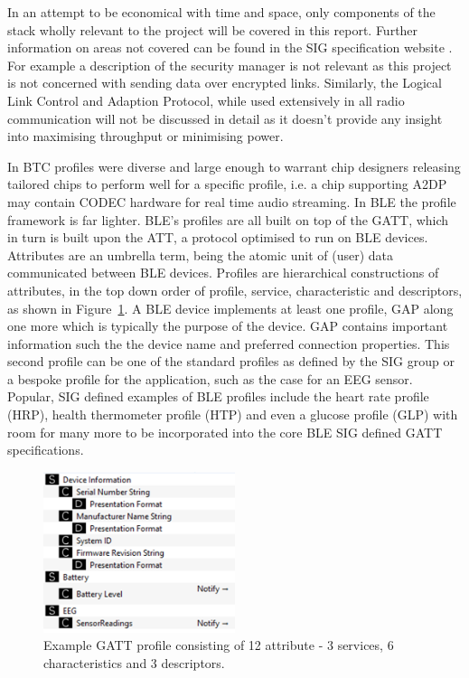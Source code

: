 \documentclass[]{article}
\begin{document}
In an attempt to be economical with time and space, only components of the stack wholly relevant to the project will be covered in this report. Further information on areas not covered can be found in the \ac{SIG} specification website \cite{btspec}. For example a description of the security manager is not relevant as this project is not concerned with sending data over encrypted links. Similarly, the Logical Link Control and Adaption Protocol, while used extensively in all radio communication will not be discussed in detail as it doesn't provide any insight into maximising throughput or minimising power.

In \ac{BTC} profiles were diverse and large enough to warrant chip designers releasing tailored chips to perform well for a specific profile, i.e. a chip supporting A2DP may contain \ac{CODEC} hardware for real time audio streaming. In \ac{BLE} the profile framework is far lighter. \ac{BLE}'s profiles are all built on top of  the \ac{GATT}, which in turn is built upon the \ac{ATT}, a protocol optimised to run on BLE devices. Attributes are an umbrella term, being the atomic unit of (user) data communicated between BLE devices. Profiles are hierarchical constructions of attributes, in the top down order of profile, service, characteristic and descriptors, as shown in Figure~\ref{fig:exampleprofile}. A BLE device implements at least one profile, \ac{GAP} along one more which is typically the purpose of the device. \ac{GAP} contains important information such the the device name and preferred connection properties.  This second profile can be one of the standard profiles as defined by the SIG group or a bespoke profile for the application, such as the case for an \ac{EEG} sensor. Popular, SIG defined examples of \ac{BLE} profiles include the heart rate profile (HRP), health thermometer profile (HTP) and even a glucose profile (GLP) with room for many more to be incorporated into the core \ac{BLE} \ac{SIG} defined \ac{GATT} specifications.  

\begin{figure}[htb]
	\begin{center}
		\includegraphics[width = 0.5\textwidth]{exampleprofile}
	\end{center}
	\caption{Example GATT profile consisting of 12 attribute - 3 services, 6 characteristics and 3 descriptors. }
	\label{fig:exampleprofile}
\end{figure}
\end{document}
